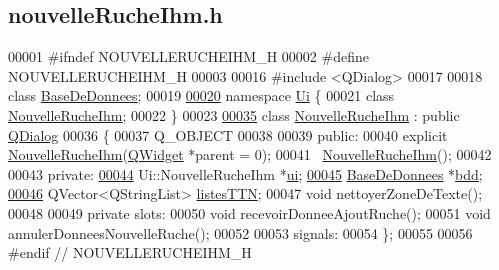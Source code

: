 \hypertarget{nouvelle_ruche_ihm_8h_source}{}\subsection{nouvelle\+Ruche\+Ihm.\+h}
\label{nouvelle_ruche_ihm_8h_source}

\begin{DoxyCode}
00001 \textcolor{preprocessor}{#ifndef NOUVELLERUCHEIHM\_H}
00002 \textcolor{preprocessor}{#define NOUVELLERUCHEIHM\_H}
00003 
00016 \textcolor{preprocessor}{#include <QDialog>}
00017 
00018 \textcolor{keyword}{class }\hyperlink{class_base_de_donnees}{BaseDeDonnees};
00019 
\hyperlink{namespace_ui}{00020} \textcolor{keyword}{namespace }\hyperlink{namespace_ui}{Ui} \{
00021 \textcolor{keyword}{class }\hyperlink{class_nouvelle_ruche_ihm}{NouvelleRucheIhm};
00022 \}
00023 
\hyperlink{class_nouvelle_ruche_ihm}{00035} \textcolor{keyword}{class }\hyperlink{class_nouvelle_ruche_ihm}{NouvelleRucheIhm} : \textcolor{keyword}{public} \hyperlink{class_q_dialog}{QDialog}
00036 \{
00037     Q\_OBJECT
00038 
00039 \textcolor{keyword}{public}:
00040     \textcolor{keyword}{explicit} \hyperlink{class_nouvelle_ruche_ihm}{NouvelleRucheIhm}(\hyperlink{class_q_widget}{QWidget} *parent = 0);
00041     ~\hyperlink{class_nouvelle_ruche_ihm}{NouvelleRucheIhm}();
00042 
00043 \textcolor{keyword}{private}:
\hyperlink{class_nouvelle_ruche_ihm_a46c1f0446fc75c67847d152d89d75960}{00044}     Ui::NouvelleRucheIhm *\hyperlink{class_nouvelle_ruche_ihm_a46c1f0446fc75c67847d152d89d75960}{ui};
\hyperlink{class_nouvelle_ruche_ihm_af552d9e6944c266060860d911878cff7}{00045}     \hyperlink{class_base_de_donnees}{BaseDeDonnees} *\hyperlink{class_nouvelle_ruche_ihm_af552d9e6944c266060860d911878cff7}{bdd}; 
\hyperlink{class_nouvelle_ruche_ihm_a0c97db3419bafe928aabed3aa01d46fb}{00046}     QVector<QStringList> \hyperlink{class_nouvelle_ruche_ihm_a0c97db3419bafe928aabed3aa01d46fb}{listesTTN};
00047     \textcolor{keywordtype}{void} nettoyerZoneDeTexte();
00048 
00049 \textcolor{keyword}{private} slots:
00050     \textcolor{keywordtype}{void} recevoirDonneeAjoutRuche();
00051     \textcolor{keywordtype}{void} annulerDonneesNouvelleRuche();
00052 
00053 signals:
00054 \};
00055 
00056 \textcolor{preprocessor}{#endif // NOUVELLERUCHEIHM\_H}
\end{DoxyCode}
